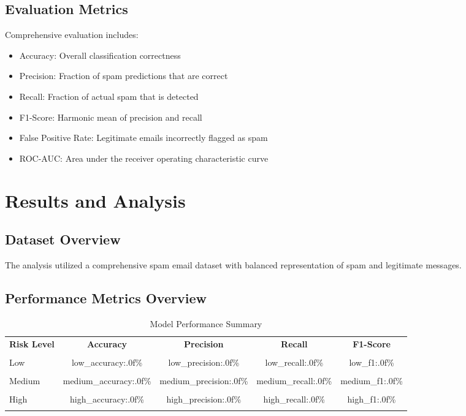 \documentclass[12pt,a4paper]{article}
\begin{document}
\subsection{Evaluation Metrics}

Comprehensive evaluation includes:
\begin{itemize}
    \item Accuracy: Overall classification correctness
    \item Precision: Fraction of spam predictions that are correct
    \item Recall: Fraction of actual spam that is detected
    \item F1-Score: Harmonic mean of precision and recall
    \item False Positive Rate: Legitimate emails incorrectly flagged as spam
    \item ROC-AUC: Area under the receiver operating characteristic curve
\end{itemize}

\section{Results and Analysis}

\subsection{Dataset Overview}

The analysis utilized a comprehensive spam email dataset with balanced representation of spam and legitimate messages.

\subsection{Performance Metrics Overview}

\begin{table}[H]
\centering
\caption{Model Performance Summary}
\begin{tabular}{@{}lcccc@{}}
\toprule
\textbf{Risk Level} & \textbf{Accuracy} & \textbf{Precision} & \textbf{Recall} & \textbf{F1-Score} \\\\
\midrule
Low & {low_accuracy:.0f}\% & {low_precision:.0f}\% & {low_recall:.0f}\% & {low_f1:.0f}\% \\\\
Medium & {medium_accuracy:.0f}\% & {medium_precision:.0f}\% & {medium_recall:.0f}\% & {medium_f1:.0f}\% \\\\
High & {high_accuracy:.0f}\% & {high_precision:.0f}\% & {high_recall:.0f}\% & {high_f1:.0f}\% \\\\
\bottomrule
\end{tabular}
\end{table}
\end{document}
